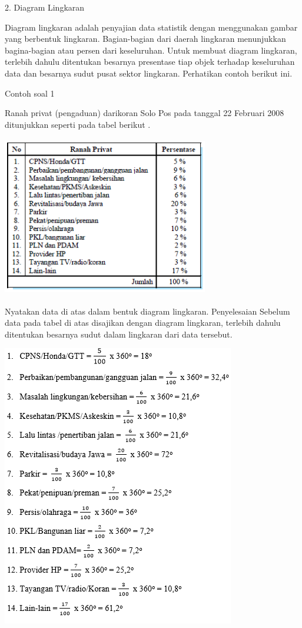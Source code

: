 \documentclass[11pt,fleqn]{book} %
\begin{document}
{2.	Diagram Lingkaran


Diagram lingkaran adalah penyajian data statistik dengan menggunakan gambar yang berbentuk lingkaran. Bagian-bagian dari daerah lingkaran menunjukkan bagina-bagian atau persen dari keseluruhan. Untuk membuat diagram lingkaran, terlebih dahulu ditentukan besarnya presentase tiap objek terhadap keseluruhan data dan besarnya sudut pusat sektor lingkaran. Perhatikan contoh berikut ini.

Contoh soal 1


Ranah privat (pengaduan) darikoran Solo Pos pada tanggal 22 Februari 2008 ditunjukkan seperti pada tabel berikut .


\includegraphics[width = 9cm, height= 7cm]{Pictures/Gb7_diana.png}

Nyatakan data di atas dalam bentuk diagram lingkaran.
Penyelesaian
Sebelum data pada tabel di atas disajikan dengan diagram lingkaran, terlebih dahulu ditentukan besarnya sudut dalam lingkaran dari data tersebut.


\includegraphics[width = 10.16cm, height= 12.36cm]{Pictures/Gb8_diana.png}


}
\end{document}
